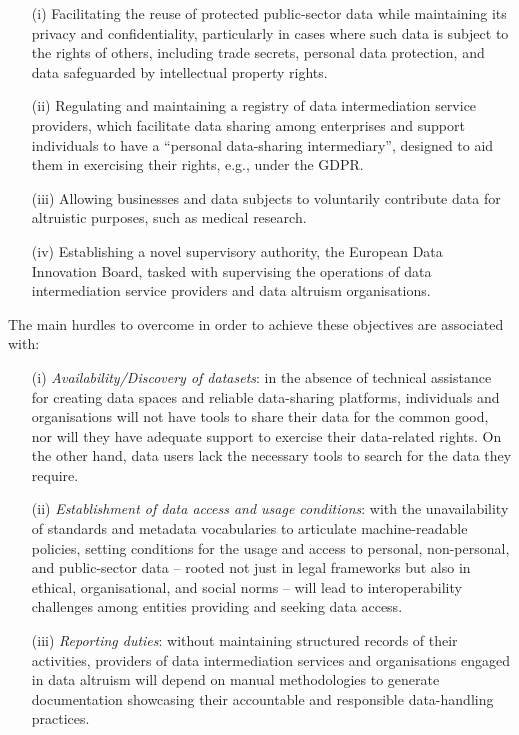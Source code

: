 \begin{enumerate}
    \item[(i)] Facilitating the reuse of protected public-sector data while maintaining its privacy and confidentiality, particularly in cases where such data is subject to the rights of others, including trade secrets, personal data protection, and data safeguarded by intellectual property rights.
    \item[(ii)] Regulating and maintaining a registry of data intermediation service providers, which facilitate data sharing among enterprises and support individuals to have a ``personal data-sharing intermediary'', designed to aid them in exercising their rights, e.g., under the GDPR.
    \item[(iii)] Allowing businesses and data subjects to voluntarily contribute data for altruistic purposes, such as medical research.
    \item[(iv)] Establishing a novel supervisory authority, the European Data Innovation Board, tasked with supervising the operations of data intermediation service providers and data altruism organisations.
\end{enumerate}

The main hurdles to overcome in order to achieve these objectives are associated with:

\begin{enumerate}
    \item[(i)] \textit{Availability/Discovery of datasets}: in the absence of technical assistance for creating data spaces and reliable data-sharing platforms, individuals and organisations will not have tools to share their data for the common good, nor will they have adequate support to exercise their data-related rights. On the other hand, data users lack the necessary tools to search for the data they require.
    \item[(ii)] \textit{Establishment of data access and usage conditions}: with the unavailability of standards and metadata vocabularies to articulate machine-readable policies, setting conditions for the usage and access to personal, non-personal, and public-sector data -- rooted not just in legal frameworks but also in ethical, organisational, and social norms -- will lead to interoperability challenges among entities providing and seeking data access.
    \item[(iii)] \textit{Reporting duties}: without maintaining structured records of their activities, providers of data intermediation services and organisations engaged in data altruism will depend on manual methodologies to generate documentation showcasing their accountable and responsible data-handling practices.
\end{enumerate}

